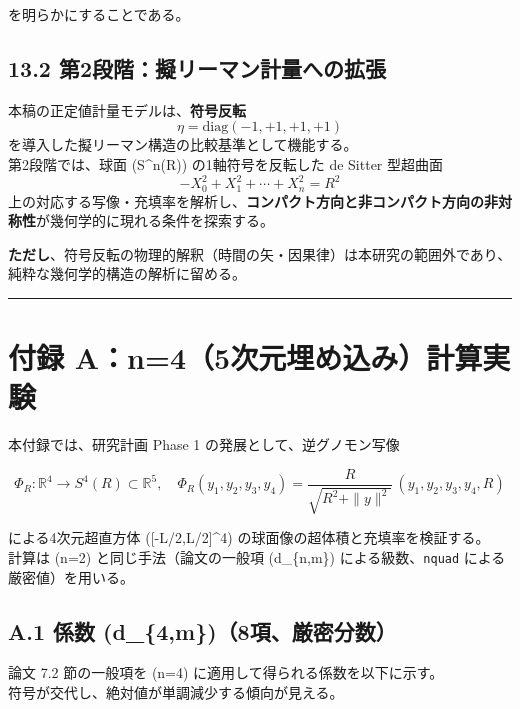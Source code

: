 \documentclass[
  12pt,
  a4paper,
]{article}
\begin{document}
を明らかにすることである。

\subsection{13.2
第2段階：擬リーマン計量への拡張}\label{ux7b2c2ux6bb5ux968eux64ecux30eaux30fcux30deux30f3ux8a08ux91cfux3078ux306eux62e1ux5f35}

本稿の正定値計量モデルは、\textbf{符号反転} \[
\eta = \mathrm{diag}(-1,+1,+1,+1)
\] を導入した擬リーマン構造の比較基準として機能する。\\
第2段階では、球面 (S\^{}n(R)) の1軸符号を反転した de Sitter 型超曲面 \[
-X_0^2 + X_1^2 + \cdots + X_n^2 = R^2
\]
上の対応する写像・充填率を解析し、\textbf{コンパクト方向と非コンパクト方向の非対称性}が幾何学的に現れる条件を探索する。

\textbf{ただし}、符号反転の物理的解釈（時間の矢・因果律）は本研究の範囲外であり、純粋な幾何学的構造の解析に留める。

\begin{center}\rule{0.5\linewidth}{0.5pt}\end{center}

\section{付録
A：n=4（5次元埋め込み）計算実験}\label{ux4ed8ux9332-an45ux6b21ux5143ux57cbux3081ux8fbcux307fux8a08ux7b97ux5b9fux9a13}

本付録では、研究計画 Phase 1 の発展として、逆グノモン写像

\[
\Phi_R:\mathbb{R}^4\to S^4(R)\subset\mathbb{R}^5,\quad
\Phi_R(y_1,y_2,y_3,y_4)=\frac{R}{\sqrt{R^2+\|y\|^2}}\,(y_1,y_2,y_3,y_4,R)
\]

による4次元超直方体 ({[}-L/2,L/2{]}\^{}4)
の球面像の超体積と充填率を検証する。\\
計算は (n=2) と同じ手法（論文の一般項 (d\_\{n,m\})
による級数、\texttt{nquad} による厳密値）を用いる。

\subsection{A.1 係数
(d\_\{4,m\})（8項、厳密分数）}\label{a.1-ux4fc2ux6570-d_4m8ux9805ux53b3ux5bc6ux5206ux6570}

論文 7.2 節の一般項を (n=4) に適用して得られる係数を以下に示す。\\
符号が交代し、絶対値が単調減少する傾向が見える。
\end{document}
